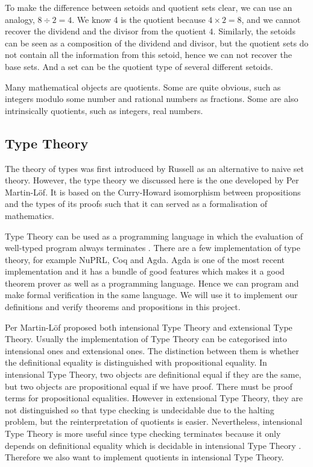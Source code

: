 \documentclass[envcountsame]{llncs}
\newcommand{\itt}{intensional Type Theory}
\newcommand{\ett}{extensional Type Theory}
\begin{document}
To make the difference between setoids and quotient sets clear, we can use an analogy, $8\div2=4$. We know 4 is the quotient because $4 \times 2 = 8$, and we cannot recover the dividend and the divisor from the quotient $4$. Similarly, the setoids can be seen as a composition of the dividend and divisor, but the quotient sets do not contain all the information from this setoid, hence we can not recover the base sets. And a set can be the quotient type of several different setoids. 


Many mathematical objects are quotients. Some are quite obvious, such as integers modulo some number and rational numbers as fractions. Some are also intrinsically quotients, such as integers, real numbers.

\subsection{Type Theory}


The theory of types was first introduced by Russell as an alternative to naive set theory. However, the type theory we discussed here is the one developed by Per Martin-L\"{o}f. It is based on the Curry-Howard isomorphism between propositions and the types of its proofs such that it can served as a formalisation of mathematics.   

Type Theory can be used as a programming language in
which the evaluation of well-typed program always terminates \cite{nor:90}. There are a few implementation of type theory, for example NuPRL, Coq and Agda. Agda is one of the most recent implementation and it has a bundle of good features which makes it a good theorem prover as well as a programming language.
Hence we can program and make formal verification in the same language. We will use it to implement our definitions and verify theorems and propositions in this project.

Per Martin-L\"{o}f proposed both \itt{} and \ett{}. Usually the implementation of Type Theory can be categorised into intensional ones and extensional ones. The distinction between them is whether the definitional equality is distinguished with
propositional equality. In \itt{}, two objects are definitional equal
if they are the same, but two objects are propositional equal if we
have proof. There must be proof terms for propositional equalities. However
in \ett{}, they are not distinguished so that type checking is
undecidable due to the halting problem, but the reinterpretation of quotients is
easier. Nevertheless, \itt{} is more useful  since type checking
terminates because it only depends on definitional equality which is
decidable in \itt{} \cite{alt:99}. Therefore we also want to implement quotients in \itt.
\end{document}
